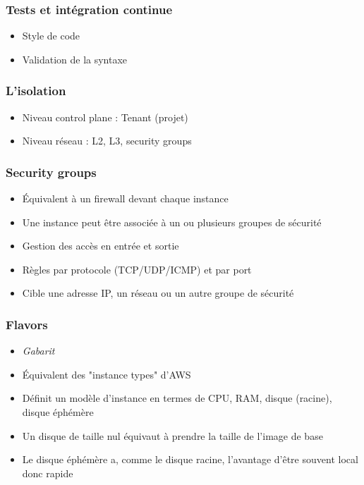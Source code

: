   \begin{frame}
    \frametitle{Tests et intégration continue}
    \begin{itemize}
      \item Style de code
      \item Validation de la syntaxe
    \end{itemize}
  \end{frame}

  \begin{frame}
    \frametitle{L'isolation}
    \begin{itemize}
      \item Niveau control plane : Tenant (projet)
      \item Niveau réseau : L2, L3, security groups
    \end{itemize}
  \end{frame}

  \begin{frame}
    \frametitle{Security groups}
    \begin{itemize}
      \item Équivalent à un firewall devant chaque instance
      \item Une instance peut être associée à un ou plusieurs groupes de sécurité
      \item Gestion des accès en entrée et sortie
      \item Règles par protocole (TCP/UDP/ICMP) et par port
      \item Cible une adresse IP, un réseau ou un autre groupe de sécurité
    \end{itemize}
  \end{frame}

  \begin{frame}
    \frametitle{Flavors}
    \begin{itemize}
      \item \textit{Gabarit}
      \item Équivalent des "instance types" d'AWS
      \item Définit un modèle d'instance en termes de CPU, RAM, disque (racine), disque éphémère
      \item Un disque de taille nul équivaut à prendre la taille de l'image de base
      \item Le disque éphémère a, comme le disque racine, l'avantage d'être souvent local donc rapide
    \end{itemize}
  \end{frame}

